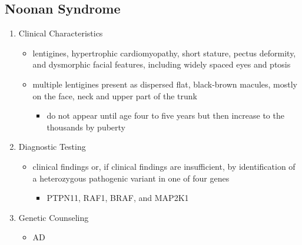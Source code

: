 \documentclass[12pt]{scrartcl}
\begin{document}
\subsection{Noonan Syndrome}
\label{sec:org9a42d8f}
\begin{enumerate}
\item Clinical Characteristics
\label{sec:orga740b51}
\begin{itemize}
\item lentigines, hypertrophic cardiomyopathy, short stature, pectus
deformity, and dysmorphic facial features, including widely spaced
eyes and ptosis
\item multiple lentigines present as dispersed flat, black-brown macules,
mostly on the face, neck and upper part of the trunk
\begin{itemize}
\item do not appear until age four to five years but then increase to
the thousands by puberty
\end{itemize}
\end{itemize}
\item Diagnostic Testing
\label{sec:org9c6febb}
\begin{itemize}
\item clinical findings or, if clinical findings are insufficient, by
identification of a heterozygous pathogenic variant in one of four
genes
\begin{itemize}
\item PTPN11, RAF1, BRAF, and MAP2K1
\end{itemize}
\end{itemize}
\item Genetic Counseling
\label{sec:org350de1d}
\begin{itemize}
\item AD
\end{itemize}
\end{enumerate}
\end{document}
